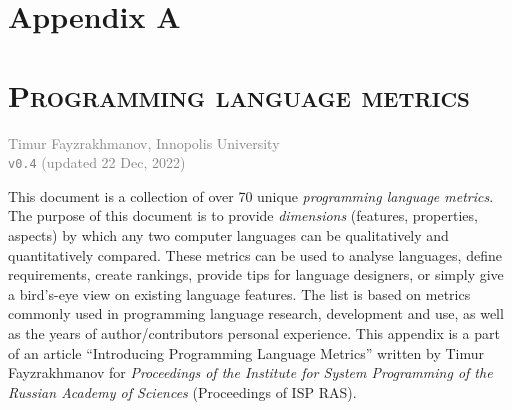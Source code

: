 \documentclass[11pt]{article}
\begin{document}
\twocolumn

\section*{Appendix A}
\label{sec:metrics-table}
\vspace{-0.8em}
\section*{\normalsize\textsc{Programming language metrics}}
\vspace{-0.5em}
\textcolor{gray}{
    \small Timur Fayzrakhmanov, Innopolis University\\
    \texttt{v0.4} (updated 22 Dec, 2022)
}

\bigskip

\noindent 
This document is a collection of over 70 unique \textit{programming language metrics}. The purpose of this document is to provide \textit{dimensions} (features, properties, aspects) by which any two computer languages can be qualitatively and quantitatively compared. These metrics can be used to analyse languages, define requirements, create rankings, provide tips for language designers, or simply give a bird's-eye view on existing language features. The list is based on metrics commonly used in programming language research, development and use, as well as the years of author/contributors personal experience.
This appendix is a part of an article ``Introducing Programming Language Metrics'' written by Timur Fayzrakhmanov for \textit{Proceedings of the Institute for System Programming of the Russian Academy of Sciences} (Proceedings of ISP RAS).



\end{document}
